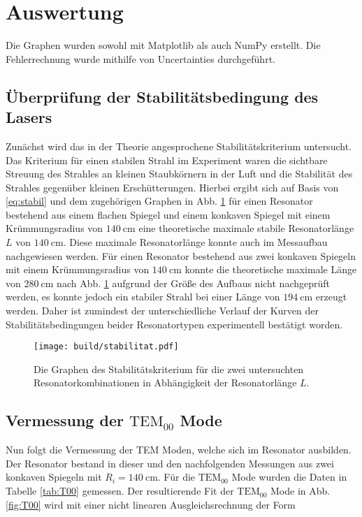 \section{Auswertung}
\label{sec:Auswertung}
Die Graphen wurden sowohl mit Matplotlib \cite{matplotlib} als auch NumPy \cite{numpy} erstellt. Die
Fehlerrechnung wurde mithilfe von Uncertainties \cite{uncertainties} durchgeführt.

\subsection{Überprüfung der Stabilitätsbedingung des Lasers}
Zunächst wird das in der Theorie angesprochene Stabilitätskriterium untersucht. Das Kriterium für einen stabilen Strahl im Experiment waren die sichtbare Streuung des Strahles an kleinen Staubkörnern in der Luft und die Stabilität des Strahles gegenüber kleinen Erschütterungen.
Hierbei ergibt sich auf Basis von \ref{eq:stabil} und dem zugehörigen Graphen in Abb. \ref{fig:stabilitat} für einen Resonator bestehend aus einem flachen Spiegel und einem konkaven Spiegel mit einem Krümmungsradius von $\SI{140}{\centi\meter}$ eine theoretische maximale stabile Resonatorlänge $L$ von $\SI{140}{\centi\meter}$. Diese maximale Resonatorlänge konnte auch im Messaufbau nachgewiesen werden. Für einen Resonator bestehend aus zwei konkaven Spiegeln mit einem Krümmungsradius von $\SI{140}{\centi\meter}$ konnte die theoretische maximale Länge von $\SI{280}{\centi\meter}$ nach Abb. \ref{fig:stabilitat} aufgrund der Größe des Aufbaus nicht nachgeprüft werden, es konnte jedoch ein stabiler Strahl bei einer Länge von $\SI{194}{\centi\meter}$ erzeugt werden. Daher ist zumindest der unterschiedliche Verlauf der Kurven der Stabilitätsbedingungen beider Resonatortypen experimentell bestätigt worden.


\begin{figure}
	\centering
	\texttt{[image: build/stabilitat.pdf]}
	\caption{Die Graphen des Stabilitätskriterium für die zwei untersuchten Resonatorkombinationen in Abhängigkeit der Resonatorlänge $L$.}
	\label{fig:stabilitat}
\end{figure}




\subsection{Vermessung der $\text{TEM}_{00}$ Mode}
Nun folgt die Vermessung der TEM Moden, welche sich im Resonator ausbilden. Der Resonator bestand in dieser und den nachfolgenden Messungen aus zwei konkaven Spiegeln mit $R_i = \SI{140}{\centi\meter}$.
Für die $\text{TEM}_\text{00}$ Mode wurden die Daten in  Tabelle \ref{tab:T00} gemessen. Der resultierende Fit der $\text{TEM}_\text{00}$ Mode in Abb. \ref{fig:T00} wird mit einer nicht linearen Ausgleichsrechnung der Form

